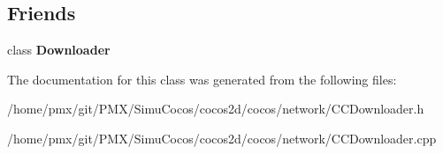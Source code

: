 \subsection*{Friends}
\begin{DoxyCompactItemize}
\item 
\mbox{\label{classcocos2d_1_1network_1_1DownloadTask_a4ba54f7080cec77e319b0dc5892baba5}} 
class {\bfseries Downloader}
\end{DoxyCompactItemize}


The documentation for this class was generated from the following files\+:\begin{DoxyCompactItemize}
\item 
/home/pmx/git/\+P\+M\+X/\+Simu\+Cocos/cocos2d/cocos/network/C\+C\+Downloader.\+h\item 
/home/pmx/git/\+P\+M\+X/\+Simu\+Cocos/cocos2d/cocos/network/C\+C\+Downloader.\+cpp\end{DoxyCompactItemize}
